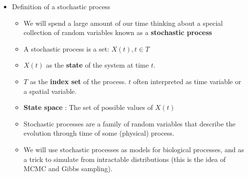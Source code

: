 \documentclass[12pt]{report}
\begin{document}
\begin{itemize}
\begin{itemize}
\begin{itemize}
\end{itemize}
\end{itemize}
\item Definition of a stochastic process
\label{sec-1-1-4-5}
\begin{itemize}
\item We will spend a large amount of our time thinking about a special collection
of random variables known as a \textbf{stochastic process}
\item A stochastic process is a set: ${X(t),t\in T}$
\item $X(t)$ as the \textbf{state} of the system at time $t$.
\item $T$ as the \textbf{index set} of the process. $t$ often interpreted as time variable or
a spatial variable.
\item \textbf{State space} : The set of possible values of $X(t)$
\item Stochastic processes are a family of random variables that describe the evolution
through time of some (physical) process.
\item We will use stochastic processes as models for biological processes, and as a
trick to simulate from intractable distributions (this is the idea of MCMC and Gibbs sampling).
\end{itemize}
\end{itemize}
\end{document}
